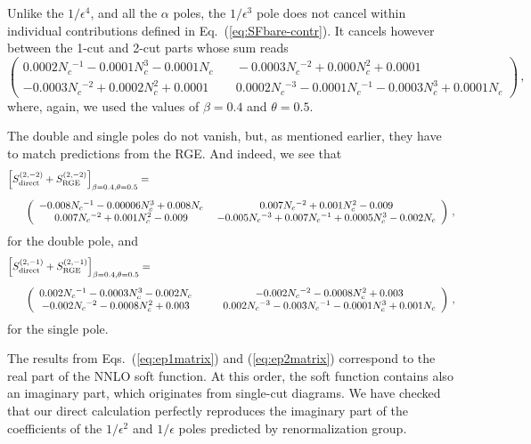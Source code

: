 \documentclass{PoS}
\begin{document}
Unlike the $1/\epsilon^4$, and all the $\alpha$ poles, 
the $1/\epsilon^3$ pole does not cancel within individual
contributions defined in Eq.~(\ref{eq:SFbare-contr}).
%
It cancels however between the 1-cut and 2-cut parts whose sum reads
%
\begin{equation}
  \left(
  \begin{array}{cc}
   0.0002 N_c{}^{-1}-0.0001 N_c^3-0.0001 N_c & \quad
   -0.0003 N_c{}^{-2}+0.000 N_c^2+0.0001 \\
   -0.0003 N_c{}^{-2}+0.0002 N_c^2+0.0001    & \quad
   0.0002 N_c{}^{-3}-0.0001 N_c{}^{-1}-0.0003 N_c^3+0.0001 N_c 
  \end{array}
  \right)\,,
\end{equation}
where, again, we used the values of $\beta=0.4$ and $\theta=0.5$.

The double and single poles do not vanish, but, as mentioned earlier, they have
to match predictions from the RGE. And indeed, we see that
%
\begin{align}
  \label{eq:ep1matrix}
  \left[S^{(2,-2)}_\text{direct} + S^{(2,-2)}_\text{RGE} 
  \right]_{\beta = 0.4, \theta = 0.5}
  & =
  \\[0.5em]
  &
  \hspace{-110pt}
  \left(
  \begin{array}{cc}
   -0.008 N_c{}^{-1}-0.00006 N_c^3+0.008 N_c & \
    0.007 N_c{}^{-2}+0.001 N_c^2-0.009 \\
    0.007 N_c{}^{-2}+0.001 N_c^2-0.009       & \
    -0.005 N_c{}^{-3}+0.007 N_c{}^{-1}+0.0005 N_c^3-0.002 N_c 
  \end{array}
  \right)\,,
  \nonumber
\end{align}
%
for the double pole, and
%
\begin{align}
  \label{eq:ep2matrix}
  \left[S^{(2,-1)}_\text{direct} + S^{(2,-1)}_\text{RGE} 
  \right]_{\beta = 0.4, \theta = 0.5}
  & =
  \\[0.5em]
  &
  \hspace{-110pt}
  \left(
  \begin{array}{cc}
   0.002 N_c{}^{-1}-0.0003 N_c^3-0.002 N_c & \qquad
   -0.002 N_c{}^{-2}-0.0008 N_c^2+0.003 \\
   -0.002 N_c{}^{-2}-0.0008 N_c^2+0.003    & \qquad
   0.002 N_c{}^{-3}-0.003 N_c{}^{-1}-0.0001 N_c^3+0.001 N_c 
  \end{array}
  \right)\,,
  \nonumber
\end{align}
%
for the single pole.

The results from Eqs.~(\ref{eq:ep1matrix}) and (\ref{eq:ep2matrix}) correspond
to the real part of the NNLO soft function. At this order, the soft function
contains also an imaginary part, which originates from single-cut diagrams. We
have checked that our direct calculation perfectly reproduces the imaginary
part of the coefficients of the $1/\epsilon^2$ and
$1/\epsilon$ poles predicted by renormalization group.
\end{document}

